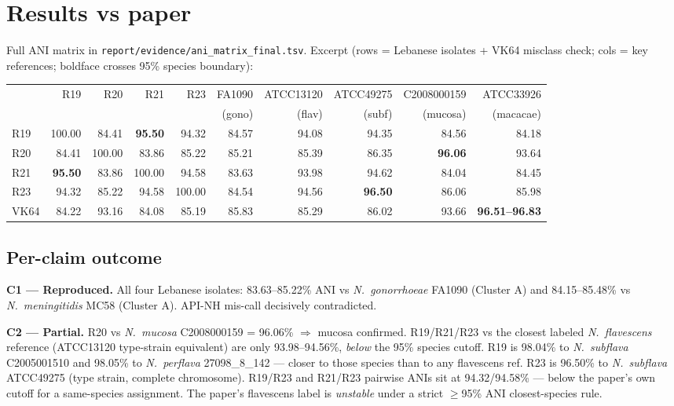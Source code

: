 \documentclass[11pt]{article}
\begin{document}
\section{Results vs paper}

Full ANI matrix in \texttt{report/evidence/ani\_matrix\_final.tsv}. Excerpt (rows = Lebanese isolates + VK64 misclass check; cols = key references; boldface crosses 95\% species boundary):

\begin{longtable}{@{}lrrrrrrrrr@{}}
\toprule
 & R19 & R20 & R21 & R23 & FA1090 & ATCC13120 & ATCC49275 & C2008000159 & ATCC33926 \\
 & & & & & (gono) & (flav) & (subf) & (mucosa) & (macacae) \\ \midrule
R19 & 100.00 & 84.41 & \textbf{95.50} & 94.32 & 84.57 & 94.08 & 94.35 & 84.56 & 84.18 \\
R20 & 84.41 & 100.00 & 83.86 & 85.22 & 85.21 & 85.39 & 86.35 & \textbf{96.06} & 93.64 \\
R21 & \textbf{95.50} & 83.86 & 100.00 & 94.58 & 83.63 & 93.98 & 94.62 & 84.04 & 84.45 \\
R23 & 94.32 & 85.22 & 94.58 & 100.00 & 84.54 & 94.56 & \textbf{96.50} & 86.06 & 85.98 \\
VK64 & 84.22 & 93.16 & 84.08 & 85.19 & 85.83 & 85.29 & 86.02 & 93.66 & \textbf{96.51--96.83} \\
\bottomrule
\end{longtable}

\subsection{Per-claim outcome}

\textbf{C1 --- Reproduced.} All four Lebanese isolates: 83.63--85.22\% ANI vs \emph{N.\ gonorrhoeae} FA1090 (Cluster A) and 84.15--85.48\% vs \emph{N.\ meningitidis} MC58 (Cluster A). API-NH mis-call decisively contradicted.

\textbf{C2 --- Partial.} R20 vs \emph{N.\ mucosa} C2008000159 = 96.06\% $\Rightarrow$ mucosa confirmed. R19/R21/R23 vs the closest labeled \emph{N.\ flavescens} reference (ATCC13120 type-strain equivalent) are only 93.98--94.56\%, \emph{below} the 95\% species cutoff. R19 is 98.04\% to \emph{N.\ subflava} C2005001510 and 98.05\% to \emph{N.\ perflava} 27098\_8\_142 --- closer to those species than to any flavescens ref. R23 is 96.50\% to \emph{N.\ subflava} ATCC49275 (type strain, complete chromosome). R19/R23 and R21/R23 pairwise ANIs sit at 94.32/94.58\% --- below the paper's own cutoff for a same-species assignment. The paper's flavescens label is \emph{unstable} under a strict $\geq$95\% ANI closest-species rule.
\end{document}
